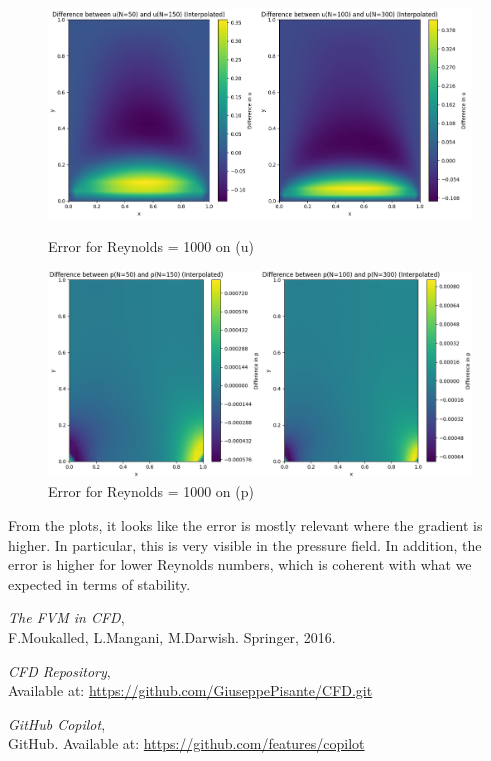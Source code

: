 \documentclass{article}
\begin{document}
\begin{figure}[h!]
  \centering
  \begin{minipage}{0.49\textwidth}
    \centering
    \includegraphics[width=\textwidth]{udiff1000.png}
    \caption{Error for Reynolds = 1000 on (u)}
  \end{minipage}
  \hfill
  \begin{minipage}{0.49\textwidth}
    \centering
    \includegraphics[width=\textwidth]{pdiff1000.png}
    \caption{Error for Reynolds = 1000 on (p)}
  \end{minipage}
\end{figure}

From the plots, it looks like the error is mostly relevant where the gradient is higher. In particular, this is very visible in the pressure field. 
In addition, the error is higher for lower Reynolds numbers, which is coherent with what we expected in terms of stability.

\newpage
\begin{thebibliography}{9}
    \textit{The FVM in CFD},\\
    F.Moukalled, L.Mangani, M.Darwish. Springer, 2016.

    \textit{CFD Repository},\\
    Available at: \url{https://github.com/GiuseppePisante/CFD.git}
    
    \textit{GitHub Copilot},\\
    GitHub. Available at: \url{https://github.com/features/copilot}
    \end{thebibliography}
\end{document}
